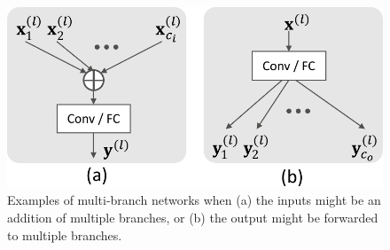\documentclass[10pt,twocolumn,letterpaper]{article}
\begin{document}
\begin{figure}[t]
	\begin{center}
		\includegraphics[width=0.8\linewidth]{figures/indegree_outdegree6.pdf}
	\end{center}
	\caption{Examples of multi-branch networks when (a) the inputs might be an addition of multiple branches, or (b) the output might be forwarded to multiple branches. 
	}
	\label{fig:indegree_outdegree}
	\vspace{-1em}
\end{figure}
\end{document}
